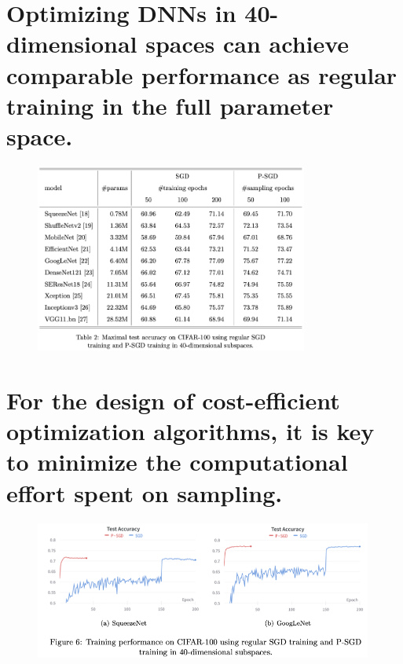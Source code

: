 \documentclass[t]{beamer}
\begin{document}
\section{Optimizing DNNs in 40-dimensional spaces can achieve comparable performance as regular training in the full parameter space.}
\begin{frame}
\begin{figure}
\includegraphics[width=0.8\textwidth]{exp-2}
\end{figure}
\end{frame}

\section{For the design of cost-efficient optimization algorithms, it is key to minimize the computational effort spent on sampling.}
\begin{frame}
\begin{figure}
\includegraphics[width=0.99\textwidth]{exp-3-img}
\end{figure}
\end{frame}
\end{document}

